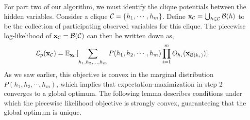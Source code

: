 For part two of our algorithm, we must identify the clique potentials between the
  hidden variables. 
Consider a clique $\mathcal{C} = \{h_1, \cdots, h_m\}$. 
Define $\mathbf{x}_{\mathcal{C}} = \bigcup_{h \in \mathcal{C}} \mathcal{B}(h)$ to be the collection of
  participating observed variables for this clique.
The piecewise log-likelihood of $\mathbf{x}_{\mathcal{C}} =\mathcal{B}(\mathcal{C})$ can then be
  written down as,
\begin{align}
  \mathcal{L}_p(\mathbf{x}_{\mathcal{C}}) 
    &= \mathbb{E}_{\mathbf{x}_{\mathcal{C}}}[ \sum_{h_1, h_2, \ldots, h_m} P(h_1, h_2, \cdots, h_m) 
    \prod_{i=1}^{m} O_{h_i}(\mathbf{x}_{\mathcal{B}(h_i)}) ]. \label{eqn:piecewise}
\end{align}
As we saw earlier, this objective is convex in the marginal distribution
  $P(h_1, h_2, \cdots, h_m)$, which implies that
  expectation-maximization in step 2 converges to a global optimum.
The following lemma describes conditions under which the piecewise
  likelihood objective is strongly convex, guaranteeing that the global
  optimum is unique.


